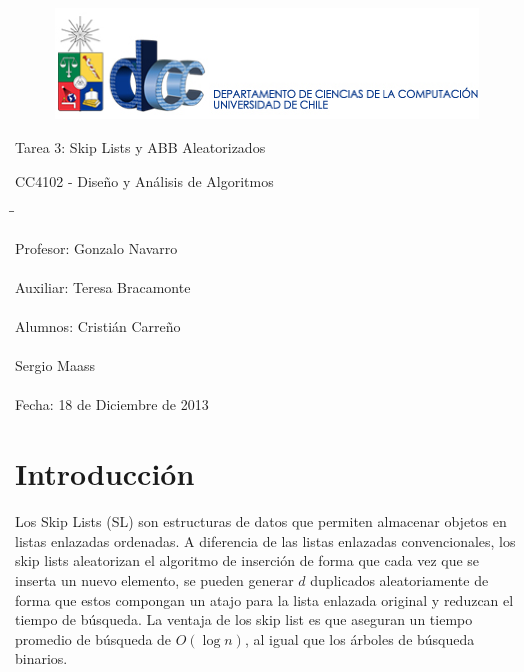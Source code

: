 \documentclass[12pt,letterpaper]{article}
\begin{document}
\begin{titlepage}
\begin{figure}[ht]
\includegraphics[scale=1]{logo_departamento.eps}
\label{DCC}
\vspace{1cm}
\end{figure}
\begin{center}
\vspace{4cm} {\Huge Tarea 3: Skip Lists y ABB Aleatorizados}

\vspace{1cm} {\Large CC4102 - Diseño y Análisis de Algoritmos}
\vspace{7.5cm}
\end{center}

\begin{tabbing}
\hspace*{7cm}\=\hspace*{3.5cm}\= \kill

\> {\large Profesor:} 	\> 	{\large Gonzalo Navarro} \\ \\
\> {\large Auxiliar:}	\> 	{\large Teresa Bracamonte} \\ \\
\> {\large Alumnos:}	\> 	{\large Cristián Carreño} \\ \\
\> {\large } 			\> 	{\large Sergio Maass} \\ \\
\> {\large Fecha:} 		\> 	{\large 18 de Diciembre de 2013}
\end{tabbing}

\end{titlepage}

\tableofcontents
\newpage

\section{Introducción}
Los Skip Lists (SL) son estructuras de datos que permiten almacenar objetos en listas enlazadas ordenadas. A diferencia de las listas enlazadas convencionales, los skip lists aleatorizan el algoritmo de inserción de forma que cada vez que se inserta un nuevo elemento, se pueden generar $d$ duplicados aleatoriamente de forma que estos compongan un atajo para la lista enlazada original y reduzcan el tiempo de búsqueda. La ventaja de los skip list es que aseguran un tiempo promedio de búsqueda de $O(\log{n})$, al igual que los árboles de búsqueda binarios.\\
\end{document}
